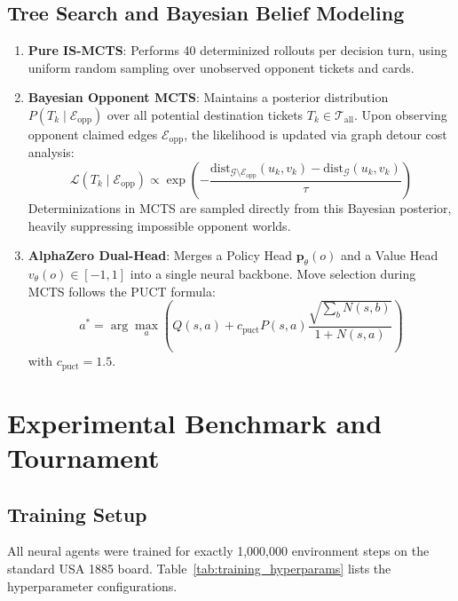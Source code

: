 \documentclass[conference,10pt]{IEEEtran}
\begin{document}
\subsection{Tree Search and Bayesian Belief Modeling}
\begin{enumerate}
    \item \textbf{Pure IS-MCTS}: Performs 40 determinized rollouts per decision turn, using uniform random sampling over unobserved opponent tickets and cards.
    \item \textbf{Bayesian Opponent MCTS}: Maintains a posterior distribution $P(T_k \mid \mathcal{E}_{\text{opp}})$ over all potential destination tickets $T_k \in \mathcal{T}_{\text{all}}$. Upon observing opponent claimed edges $\mathcal{E}_{\text{opp}}$, the likelihood is updated via graph detour cost analysis:
    \begin{equation}
    \mathcal{L}(T_k \mid \mathcal{E}_{\text{opp}}) \propto \exp\left( -\frac{\text{dist}_{\mathcal{G} \setminus \mathcal{E}_{\text{opp}}}(u_k, v_k) - \text{dist}_{\mathcal{G}}(u_k, v_k)}{\tau} \right)
    \end{equation}
    Determinizations in MCTS are sampled directly from this Bayesian posterior, heavily suppressing impossible opponent worlds.
    \item \textbf{AlphaZero Dual-Head}: Merges a Policy Head $\mathbf{p}_\theta(o)$ and a Value Head $v_\theta(o) \in [-1, 1]$ into a single neural backbone. Move selection during MCTS follows the PUCT formula:
    \begin{equation}
    a^* = \arg\max_a \left( Q(s, a) + c_{\text{puct}} P(s, a) \frac{\sqrt{\sum_b N(s, b)}}{1 + N(s, a)} \right)
    \end{equation}
    with $c_{\text{puct}} = 1.5$.
\end{enumerate}

\section{Experimental Benchmark and Tournament}
\label{sec:experiments}

\subsection{Training Setup}
All neural agents were trained for exactly 1,000,000 environment steps on the standard USA 1885 board. Table~\ref{tab:training_hyperparams} lists the hyperparameter configurations.


\end{document}
